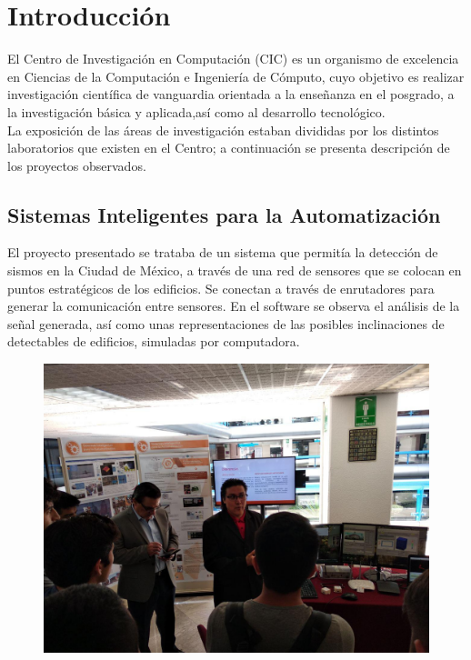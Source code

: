 \documentclass[11pt,letterpaper]{article}
\begin{document}


\section*{Introducción}
El Centro de Investigación en Computación (CIC) es un organismo de excelencia en Ciencias de la Computación e Ingeniería de Cómputo, cuyo objetivo es realizar investigación científica de vanguardia orientada a la enseñanza en el posgrado, a la investigación básica y aplicada,así como al desarrollo tecnológico.\\

La exposición de las áreas de investigación estaban divididas por los distintos laboratorios que existen en el Centro; a continuación se presenta descripción de los proyectos observados.


\subsection*{Sistemas Inteligentes para la Automatización}

El proyecto presentado se trataba de un sistema que permitía la detección de sismos en la Ciudad de México, a través de una red de sensores que se colocan en puntos estratégicos de los edificios. Se conectan a través de enrutadores para generar la comunicación entre sensores. En el software se observa el análisis de la señal generada, así como unas representaciones de las posibles inclinaciones de detectables de edificios, simuladas por computadora.

\begin{figure}[H]
	\centering
	\includegraphics[scale = 0.4]{images/sismo1}
\end{figure}
\end{document}
